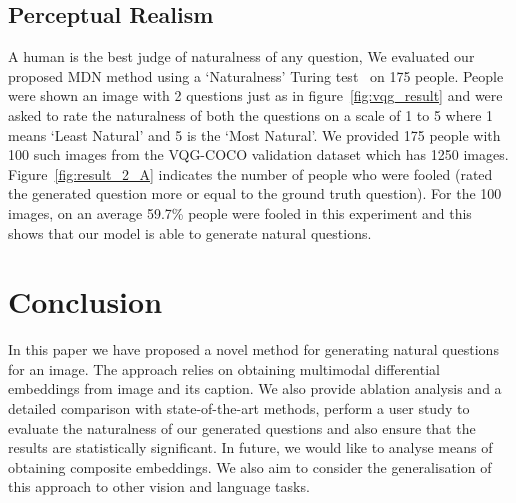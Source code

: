 \documentclass[11pt,a4paper]{article}
\begin{document}
\subsection{Perceptual Realism}\label{percep_real}
A human is the best judge of naturalness of any question, We evaluated our proposed MDN method using a `Naturalness' Turing test~\cite{Zhang_ECCV2016} on 175 people. 
People were shown an image with 2 questions just as in figure~\ref{fig:vqg_result} and were asked to rate the naturalness of both the questions on a scale of 1 to 5  where 1 means `Least Natural' and 5 is the `Most Natural'. We provided 175 people with 100 such images from the VQG-COCO validation dataset which has 1250 images. Figure~\ref{fig:result_2_A} indicates the number of people who were fooled (rated the generated question more or equal to the ground truth question). For the 100 images, on an average 59.7\% people were fooled in this experiment and this shows that our model is able to generate natural questions. 




\section{Conclusion}
In this paper we have proposed a novel method for generating natural questions for an image. The approach relies on obtaining multimodal differential embeddings from image and its caption.
We also provide ablation analysis and a detailed comparison with state-of-the-art methods, perform a user study to evaluate the naturalness of our generated questions and also ensure that the results are statistically significant.
In future, we would like to analyse means of obtaining composite embeddings. We also aim to consider the generalisation of this approach to other vision and language tasks.









\appendix
\end{document}
